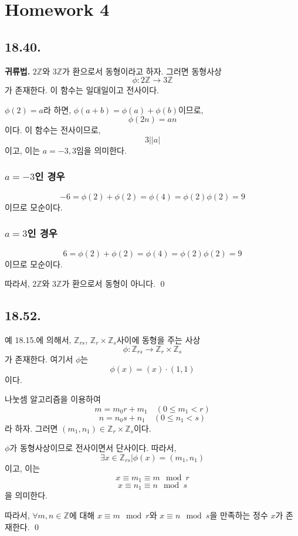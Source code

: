 \documentclass{article}
\begin{document}
\twocolumn


\chapter{Homework 4}

\section{18.40.}
\textbf{귀류법.} $2\mathbb{Z}$와 $3\mathbb{Z}$가 환으로서 동형이라고 하자.
그러면 동형사상
$$\phi : 2\mathbb{Z} \rightarrow 3\mathbb{Z}$$
가 존재한다. 이 함수는 일대일이고 전사이다.

$\phi(2) = a$라 하면, $\phi(a + b) = \phi(a) + \phi(b)$이므로, 
$$\phi(2n) = an$$이다. 이 함수는 전사이므로, 
$$3 \bigg| \left| a\right|$$이고, 이는 $a = -3, 3$임을 의미한다.

\subsection{$a=-3$인 경우}
$$-6 = \phi(2) + \phi(2) = \phi(4) = \phi(2) \phi(2) = 9$$
이므로 모순이다.
\subsection{$a=3$인 경우}
$$6 = \phi(2) + \phi(2) = \phi(4) = \phi(2) \phi(2) = 9$$
이므로 모순이다.

따라서, $2\mathbb{Z}$와 $3\mathbb{Z}$가 환으로서 동형이 아니다. \qed

\section{18.52.}
예 18.15.에 의해서, $\mathbb{Z}_{rs}$, $\mathbb{Z}_r \times \mathbb{Z}_s$사이에 동형을 주는 사상
$$\phi : \mathbb{Z}_{rs} \rightarrow \mathbb{Z}_r \times \mathbb{Z}_s$$
가 존재한다. 여기서 $\phi$는
$$\phi(x) = (x) \cdot (1, 1)$$이다.

나눗셈 알고리즘을 이용하여 
$$m = m_0 r + m_1 \quad (0 \le m_1 < r)$$ 
$$n = n_0 s + n_1 \quad (0 \le n_1 < s)$$라 하자. 
그러면 $(m_1, n_1) \in \mathbb{Z}_r \times \mathbb{Z}_s$이다.

$\phi$가 동형사상이므로 전사이면서 단사이다. 따라서,
$$\exists x \in \mathbb{Z}_{rs} \bigg| \phi(x) = (m_1, n_1)$$
이고, 이는 
$$x \equiv m_1 \equiv m \mod r$$
$$x \equiv n_1 \equiv n \mod s$$
을 의미한다.

따라서, $\forall m, n \in \mathbb{Z}$에 대해 
$x \equiv m \mod r$와
$x \equiv n \mod s$을 만족하는 정수 $x$가 존재한다. \qed
\end{document}
